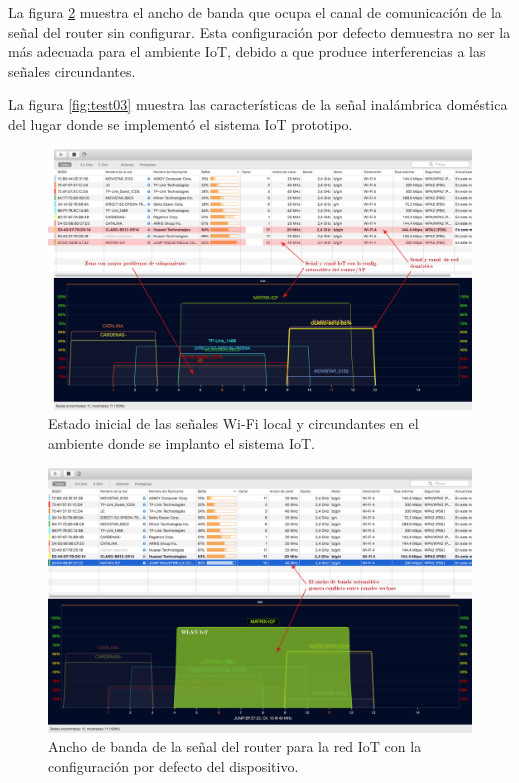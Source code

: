 La figura \ref{fig:test02} muestra el ancho de banda que ocupa el canal de comunicación de la señal del router sin configurar. Esta configuración por defecto demuestra no ser la más adecuada para el ambiente IoT, debido a que produce interferencias a las señales circundantes.

La figura \ref{fig:test03} muestra las características de la señal inalámbrica doméstica del lugar donde se implementó el sistema IoT prototipo.


\begin{landscape} %
\begin{figure}[htpb]
\centering 
\includegraphics[width=1.5\textwidth]{./Figures/wifi/01.png}
\caption{Estado inicial de las señales Wi-Fi local y circundantes en el ambiente donde se implanto el sistema IoT.}
\label{fig:test01}
\end{figure}
\end{landscape} %


\begin{landscape} %
\begin{figure}[htpb]
\centering 
\includegraphics[width=1.5\textwidth]{./Figures/wifi/02.png}
\caption{Ancho de banda de la señal del router para la red IoT con la configuración por defecto del dispositivo.}
\label{fig:test02}
\end{figure}
\end{landscape} %


